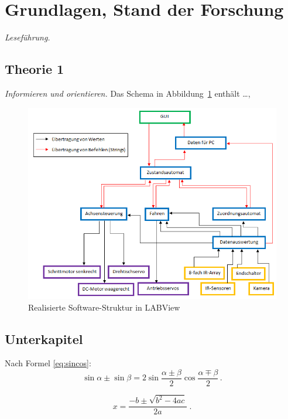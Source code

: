 \section{Grundlagen, Stand der Forschung}

\emph{Leseführung.} \lipsum[6-6]

\nocite{*}

\subsection{Theorie 1}

\emph{Informieren und orientieren.} Das Schema in Abbildung~\ref{fig:software_struktur} enthält \ldots, \lipsum[7-7]

\begin{figure}[b]
\begin{center}
\includegraphics[width=\linewidth]{graphics/software_struktur.png}
\end{center}
\caption{Realisierte Software-Struktur in LABView}
\label{fig:software_struktur}
\end{figure}

\subsection{Unterkapitel}

\lipsum[8]  Nach Formel \eqref{eq:sincos}:
\begin{equation}
\sin \alpha \pm \sin \beta = 2\sin\frac{\alpha\pm\beta}{2}\cos\frac{\alpha\mp\beta}{2}\,. \label{eq:sincos}
\end{equation}

\lipsum[9]
\begin{equation}
x = \frac{-b\pm\sqrt{b^2-4ac}}{2a}\;.
\end{equation}

